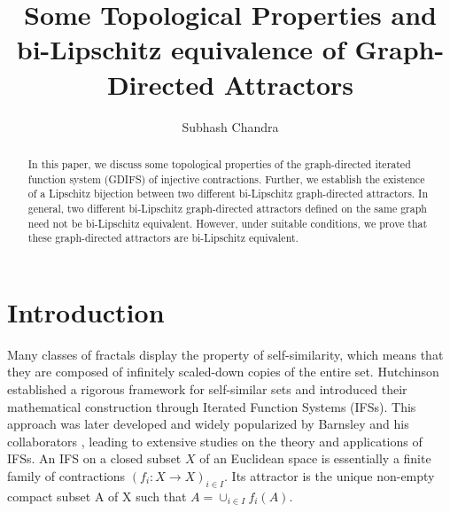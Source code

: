 \documentclass[a4paper,12pt,reqno]{amsart}
\numberwithin{equation}{section}
\theoremstyle{definition}
\theoremstyle{remark}
\numberwithin{equation}{section}
\begin{document}
	
	\title[Some Topological Properties and bi-Lipschitz equivalence of GDA]{Some Topological Properties and bi-Lipschitz equivalence of Graph-Directed Attractors}
	

	
	
	
	
		\author{Subhash Chandra}
	
	\address{Faculty of Mathematics and Computer Science, Transilvania University of Braşov, Iuliu Maniu Street, nr. 50, 500091, Braşov, Romania}
	
	
	

	
	
	
	\begin{abstract}In this paper, we discuss some topological properties of the graph-directed iterated function system (GDIFS) of injective contractions. Further, we establish the existence of a Lipschitz bijection between two different bi-Lipschitz graph-directed attractors. In general, two different bi-Lipschitz graph-directed attractors defined on the same graph need not be bi-Lipschitz equivalent. However, under suitable conditions, we prove that these graph-directed attractors are bi-Lipschitz equivalent.
	\end{abstract}
	\maketitle
	
	
	
	
	\section{Introduction}
    Many classes of fractals display the property of self-similarity, which means that they are composed of infinitely scaled-down copies of the entire set. Hutchinson \cite{HT} established a rigorous framework for self-similar sets and introduced their mathematical construction through Iterated Function Systems (IFSs). This approach was later developed and widely popularized by Barnsley and his collaborators \cite{MF1, MF2,MF3}, leading to extensive studies on the theory and applications of IFSs. An IFS on a closed subset $X$ of an Euclidean space is essentially a finite family of contractions  
$(f_i: X \to X )_{i \in I}.$ Its attractor is the unique non-empty compact subset A of X such that   $A=\cup_{i \in I} f_i(A)$.
\end{document}
